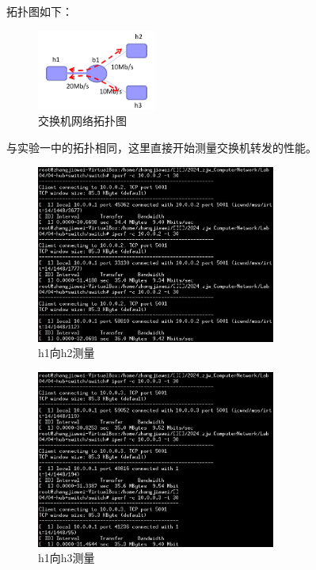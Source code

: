 \documentclass[UTF8]{report}
\begin{document}
拓扑图如下：

\begin{figure}[H]
    \centering
    \includegraphics[width=0.35\textwidth]{topo1.png}
    \caption{交换机网络拓扑图}
\end{figure}

与实验一中的拓扑相同，这里直接开始测量交换机转发的性能。

\begin{figure}[H]
    \centering
    \includegraphics[width=0.7\textwidth]{h1toh2_2.png}
    \caption{h1向h2测量}
\end{figure}

\begin{figure}[H]
    \centering
    \includegraphics[width=0.7\textwidth]{h1toh3_2.png}
    \caption{h1向h3测量}
\end{figure}
\end{document}
